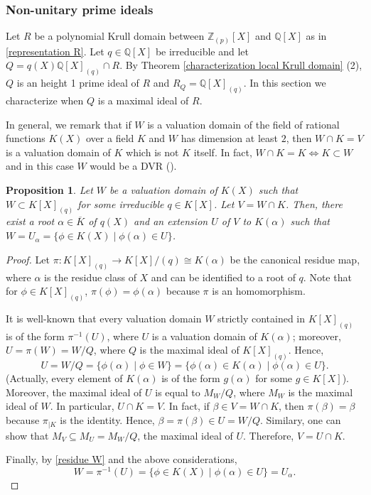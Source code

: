 \documentclass[10pt]{article}
\numberwithin{equation}{section}
\newtheorem{Prop}[equation]{Proposition}
\theoremstyle{definition}
\theoremstyle{definition}
\newcommand{\Q}{\mathbb{Q}}
\newcommand{\Z}{\mathbb{Z}}
\newcommand{\olK}{\overline{K}}
\newcommand{\oQp}{\overline{\Q_p}}
\begin{document}
\subsubsection{Non-unitary prime ideals}\label{section: non-unitary prime ideals}

Let $R$ be a polynomial Krull domain between $\Z_{(p)}[X]$ and $\Q[X]$ as in \eqref{representation R}.
Let $q\in\Q[X]$ be irreducible and let $Q=q(X)\Q[X]_{(q)}\cap R$. By Theorem \ref{characterization local Krull domain} (2), $Q$ is an height 1 prime ideal of $R$ and $R_Q=\Q[X]_{(q)}$. In this section we characterize when $Q$ is a maximal ideal of $R$.

In general, we remark that if $W$ is a valuation domain of the field of rational functions $K(X)$ over a field $K$ and $W$ has dimension at least $2$, then $W\cap K=V$ is a valuation domain of $K$ which is not $K$ itself. In fact, $W\cap K=K\Leftrightarrow K\subset W$ and in this case $W$ would be a DVR (\cite[p. 3]{Chevalley}).

\begin{Prop}\label{subvaluation of DVR}
Let $W$ be a valuation domain of $K(X)$ such that $W\subset K[X]_{(q)}$ for some irreducible $q\in K[X]$. Let $V=W\cap K$. Then, there exist a root $\alpha\in\olK$ of $q(X)$ and an extension $U$ of $V$ to $K(\alpha)$ such that $W=U_{\alpha}=\{\phi\in K(X)\mid \phi(\alpha)\in U\}$.
\end{Prop}
\begin{proof}
 Let $\pi:K[X]_{(q)}\to K[X]/(q)\cong K(\alpha)$ be the canonical residue map, where $\alpha$ is the residue class of $X$ and can be identified to a root of $q$. Note that for $\phi\in K[X]_{(q)}$, $\pi(\phi)=\phi(\alpha)$ because $\pi$ is an homomorphism.

It is well-known that every valuation domain $W$ strictly contained in $K[X]_{(q)}$ is of the form $\pi^{-1}(U)$, where $U$ is a valuation domain of $K(\alpha)$; moreover, $U=\pi(W)=W/Q$, where $Q$ is the maximal ideal of $K[X]_{(q)}$.  Hence,
\begin{equation}\label{residue W}
U=W/Q=\{\phi(\alpha)\mid \phi\in W\}=\{\phi(\alpha)\in K(\alpha)\mid \phi(\alpha)\in U\}.    
\end{equation}
(Actually, every element of $K(\alpha)$ is of the form $g(\alpha)$ for some $g\in K[X]$). Moreover, the maximal ideal of $U$ is equal to $M_W/Q$, where $M_W$ is the maximal ideal of $W$. In particular, $U\cap K=V$. In fact, if $\beta\in V=W\cap K$, then $\pi(\beta)=\beta$ because $\pi_{\mid K}$ is the identity. Hence, $\beta=\pi(\beta)\in U=W/Q$. Similary, one can show that $M_V\subseteq M_U=M_W/Q$, the maximal ideal of $U$. Therefore, $V=U\cap K$.

Finally, by \eqref{residue W} and the above considerations, 
$$W=\pi^{-1}(U)=\{\phi\in K(X)\mid \phi(\alpha)\in U\}=U_{\alpha}.$$
\end{proof}
\end{document}
